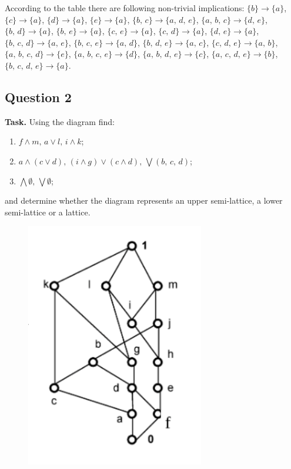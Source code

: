 \documentclass[14pt,a4paper]{extarticle}
\begin{document}
	\noindent According to the table there are following non-trivial implications: $\{b\}\rightarrow \{a\}$, $\{c\}\rightarrow \{a\}$, $\{d\}\rightarrow \{a\}$, $\{e\}\rightarrow \{a\}$, $\{b,\, c\}\rightarrow\{a,\, d,\, e\}$, $\{a,\, b,\, c\}\rightarrow\{d,\, e\}$, $\{b,\, d\}\rightarrow \{a\}$, $\{b,\, e\}\rightarrow \{a\}$, $\{c,\, e\}\rightarrow \{a\}$, $\{c,\, d\}\rightarrow \{a\}$, $\{d,\, e\}\rightarrow \{a\}$, $\{b,\, c,\, d\}\rightarrow\{a,\, e\}$, $\{b,\, c,\, e\}\rightarrow\{a,\, d\}$, $\{b,\, d,\, e\}\rightarrow\{a,\, c\}$, $\{c,\, d,\, e\}\rightarrow\{a,\, b\}$, $\{a,\, b,\, c,\, d\}\rightarrow\{e\}$, $\{a,\, b,\, c,\, e\}\rightarrow\{d\}$, $\{a,\, b,\, d,\, e\}\rightarrow\{c\}$, $\{a,\, c,\, d,\, e\}\rightarrow\{b\}$, $\{b,\, c,\, d,\, e\}\rightarrow\{a\}$.
	\newpage
	 
	\subsection*{Question 2}
	 
	\noindent\textbf{Task.} Using the diagram find:
	\begin{enumerate}
		\item $f\land m,\, a\lor l,\, i\land k$;
		\item $a\land(c\lor d),\, (i\land g)\lor(c\land d),\, \bigvee(b,\, c,\, d)$;
		\item $\bigwedge \emptyset,\, \bigvee \emptyset$;
	\end{enumerate}
	and determine whether the diagram represents an upper semi-lattice, a lower semi-lattice or a lattice.
	 
	\begin{figure}[h]
		\includegraphics[scale=1.0]{media/task2.png}
		\centering
	\end{figure}
	 
\end{document}
